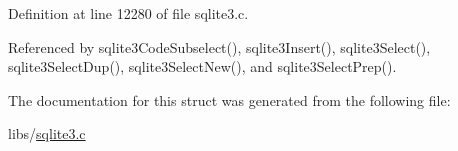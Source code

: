 Definition at line 12280 of file sqlite3.\+c.



Referenced by sqlite3\+Code\+Subselect(), sqlite3\+Insert(), sqlite3\+Select(), sqlite3\+Select\+Dup(), sqlite3\+Select\+New(), and sqlite3\+Select\+Prep().



The documentation for this struct was generated from the following file\+:\begin{DoxyCompactItemize}
\item 
libs/\hyperlink{sqlite3_8c}{sqlite3.\+c}\end{DoxyCompactItemize}
